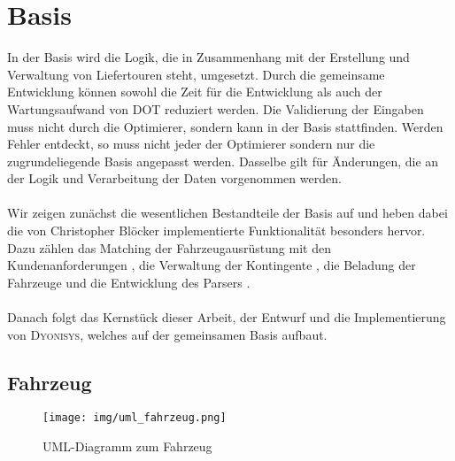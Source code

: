\section{Basis}\label{chp:basis}
In der Basis wird die Logik, die in Zusammenhang mit der Erstellung und Verwaltung von Liefertouren steht, umgesetzt. Durch die gemeinsame Entwicklung können sowohl die Zeit für die Entwicklung als auch der Wartungsaufwand von \textsc{DOT} reduziert werden. Die Validierung der Eingaben muss nicht durch die Optimierer, sondern kann in der Basis stattfinden. Werden Fehler entdeckt, so muss nicht jeder der Optimierer sondern nur die zugrundeliegende Basis angepasst werden. Dasselbe gilt für Änderungen, die an der Logik und Verarbeitung der Daten vorgenommen werden. \\
\\
Wir zeigen zunächst die wesentlichen Bestandteile der Basis auf und heben dabei die von Christopher Blöcker implementierte Funktionalität besonders hervor. Dazu zählen das Matching der Fahrzeugausrüstung mit den Kundenanforderungen , die Verwaltung der Kontingente , die Beladung der Fahrzeuge  und die Entwicklung des Parsers . \\
\\
Danach folgt das Kernstück dieser Arbeit, der Entwurf und die Implementierung von \textsc{Dyonisys}, welches auf der gemeinsamen Basis aufbaut.


\subsection{Fahrzeug}
\begin{figure}[h!]
  \centering
  \texttt{[image: img/uml\_fahrzeug.png]}
  \caption{UML-Diagramm zum Fahrzeug}
  \label{fig:uml_fahrzeug}
\end{figure}

